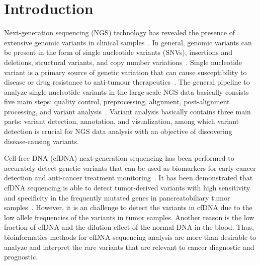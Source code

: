 \documentclass[a4,center,fleqn]{NAR}
\begin{document}
\section{Introduction}
Next-generation sequencing (NGS) technology has revealed the presence of extensive genomic variants in clinical samples~\citep{koboldt2013next}.
In general, genomic variants can be present in the form of single nucleotide variants (SNVs), insertions and deletions, structural variants, and copy number variations~\citep{Bao2014}.
Single nucleotide variant is a primary source of genetic variation that can cause susceptibility to disease or drug resistance to anti-tumour therapeutics~\citep{kessler2014resistance}.
The general pipeline to analyze single nucleotide variants in the large-scale NGS data basically consists five main steps: quality control, preprocessing, alignment, post-alignment processing, and variant analysis~\citep{pabinger2014survey, Bao2014}.
Variant analysis basically contains three main parts: variant detection, annotation, and visualization, among which variant detection is crucial for NGS data analysis with an objective of discovering disease-causing variants.


Cell-free DNA (cfDNA) next-generation sequencing has been performed to accurately detect genetic variants that can be used as biomarkers for early cancer detection and anti-cancer treatment monitoring~\citep{schwarzenbach2011cell, zhou2014pilot}.
It has been demonstrated that cfDNA sequencing is able to detect tumor-derived variants with high sensitivity and specificity in the frequently mutated genes in pancreatobiliary tumor samples~\citep{zill2015cell}.
However, it is an challenge to detect the variants in cfDNA due to the low allele frequencies of the variants in tumor samples.
Another reason is the low fraction of cfDNA and the dilution effect of the normal DNA in the blood. 
Thus, bioinformatics methods for cfDNA sequencing analysis are more than desirable to analyze and interpret the rare variants that are relevant to cancer diagnostic and prognostic.
\end{document}
